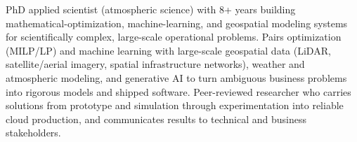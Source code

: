 

PhD applied scientist (atmospheric science) with 8+ years building mathematical-optimization, machine-learning, and geospatial modeling systems for scientifically complex, large-scale operational problems. Pairs optimization (MILP/LP) and machine learning with large-scale geospatial data (LiDAR, satellite/aerial imagery, spatial infrastructure networks), weather and atmospheric modeling, and generative AI to turn ambiguous business problems into rigorous models and shipped software. Peer-reviewed researcher who carries solutions from prototype and simulation through experimentation into reliable cloud production, and communicates results to technical and business stakeholders.









